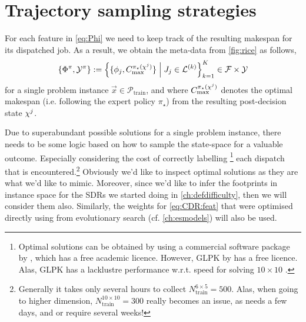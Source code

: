 \section{Trajectory sampling strategies}\label{sec:trdat:tracks}
For each feature in \cref{eq:Phi} we need to keep track of the resulting 
makespan for its dispatched job. 
As a result, we obtain the meta-data from 
\cref{fig:rice} as follows, 
\begin{equation}\label{eq:trdat:metadata}
\{\Phi^\pi,\mathcal{Y}^\pi\} := 
\condset{\{ \vphi_j, C_{\max}^{\pi_\star(\vchi^j)}
    \}}{J_j\in\mathcal{L}^{(k)}}_{k=1}^K \in \mathcal{F} \times \mathcal{Y}
\end{equation}
for a single problem instance $\vec{x}\in\mathcal{P}_{\text{train}}$, and where 
$C_{\max}^{\pi_\star({\mathbf{\chi}}^j)}$ denotes the optimal makespan (i.e. following 
the expert policy $\pi_\star$) from the resulting post-decision state ${\mathbf{\chi}}^j$.

Due to superabundant possible solutions for a single problem instance, 
there needs to be some logic based on how to sample the state-space for a 
valuable outcome. Especially considering the cost of correctly labelling 
\footnote{Optimal solutions can be obtained by using a commercial software 
    package by \citet{gurobi}, which has a free academic licence. However, GLPK 
    by \citet{glpk} has a free licence. Alas, GLPK has a lacklustre performance 
    w.r.t. speed for solving $10\times10$ \JSP.}
each dispatch that is encountered.\footnote{Generally it takes 
    only several hours to collect $N_{\text{train}}^{6\times5}=500$. Alas, when 
    going to higher dimension, $N_{\text{train}}^{10\times10}=300$ 
    really becomes an issue, as  needs a few days, and 
     or  require several weeks!}
Obviously we'd like to inspect optimal solutions as they are what we'd like to 
mimic. Moreover, since we'd like to infer the footprints in instance space for 
the SDRs we started doing in \cref{ch:defdifficulty}, then we will consider 
them also.
Similarly, the weights for \cref{eq:CDR:feat} that were optimised directly 
using from evolutionary search (cf. \cref{ch:esmodels}) will also be used.

